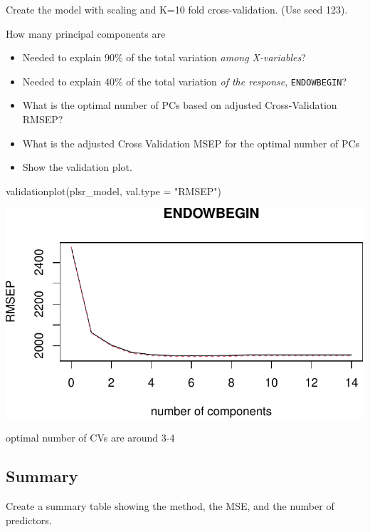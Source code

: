 \documentclass[
  letterpaper,
  DIV=11,
  numbers=noendperiod]{scrartcl}
\newenvironment{Shaded}{\begin{snugshade}}{\end{snugshade}}
\newcommand{\AttributeTok}[1]{\textcolor[rgb]{0.40,0.45,0.13}{#1}}
\newcommand{\FunctionTok}[1]{\textcolor[rgb]{0.28,0.35,0.67}{#1}}
\newcommand{\NormalTok}[1]{\textcolor[rgb]{0.00,0.23,0.31}{#1}}
\newcommand{\StringTok}[1]{\textcolor[rgb]{0.13,0.47,0.30}{#1}}
\providecommand{\tightlist}{%
  \setlength{\itemsep}{0pt}\setlength{\parskip}{0pt}}\usepackage{longtable,booktabs,array}
\begin{document}
Create the model with scaling and K=10 fold cross-validation. (Use seed
123).

How many principal components are

\begin{itemize}
\tightlist
\item
  Needed to explain 90\% of the total variation \emph{among
  X-variables}?
\item
  Needed to explain 40\% of the total variation \emph{of the response},
  \texttt{ENDOWBEGIN}?
\item
  What is the optimal number of PCs based on adjusted Cross-Validation
  RMSEP?
\item
  What is the adjusted Cross Validation MSEP for the optimal number of
  PCs
\item
  Show the validation plot.
\end{itemize}

\begin{Shaded}
\begin{Highlighting}[]
\FunctionTok{validationplot}\NormalTok{(plsr\_model, }\AttributeTok{val.type =} \StringTok{"RMSEP"}\NormalTok{)}
\end{Highlighting}
\end{Shaded}

\includegraphics{Final_627_Tshiani_files/figure-pdf/unnamed-chunk-18-1.pdf}

optimal number of CVs are around 3-4

\subsection{Summary}\label{summary}

Create a summary table showing the method, the MSE, and the number of
predictors.
\end{document}
